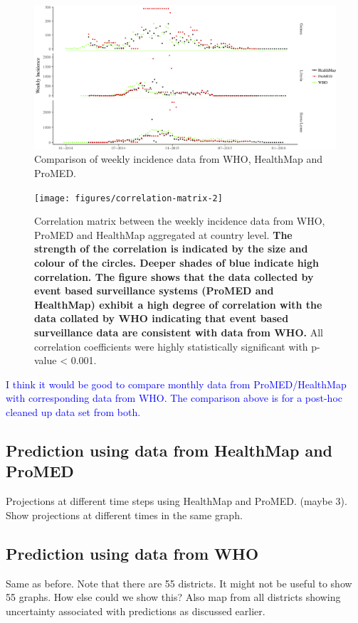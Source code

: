\documentclass[a4paper,12pt]{article}
\def\sb#1{\textcolor{blue}{#1}}
\begin{document}
\begin{figure}
    \centering
        \includegraphics[width=\textwidth]{figures/who_hm_pm_weekly_incid-2}
        \caption{Comparison of weekly incidence data from WHO, HealthMap and ProMED.}
        \label{fig:incid_comp}
  \end{figure}


  \begin{figure}
    \centering
    \texttt{[image: figures/correlation-matrix-2]}
    \caption{Correlation matrix between the weekly incidence data from WHO,
      ProMED and HealthMap aggregated at country level. \textbf{The strength of the correlation is
      indicated by the size and colour of the circles.
      Deeper shades of blue indicate high correlation. The figure
      shows that the data collected by event based surveillance
      systems (ProMED and HealthMap) exhibit a
      high degree of correlation with the data collated by WHO
      indicating that  event based surveillance data are consistent with data
      from WHO.} All
      correlation coefficients were  highly statistically significant
      with p-value < 0.001.}
    \label{fig:corrplot}
  \end{figure}

  \sb{I think it would be good to compare monthly data from
   ProMED/HealthMap with corresponding data from WHO. The comparison
   above is for a post-hoc cleaned up data set from both.} 

 \subsection*{Prediction using data from HealthMap and ProMED}
 Projections at different time steps using HealthMap and
 ProMED. (maybe 3).
 Show projections at different times in the same graph.

 \subsection*{Prediction using data from WHO}
 Same as before. Note that there are 55 districts. It might not be
 useful to show 55 graphs. How else could we show this?
 Also map from all districts showing uncertainty
 associated with predictions as discussed earlier.
\end{document}
